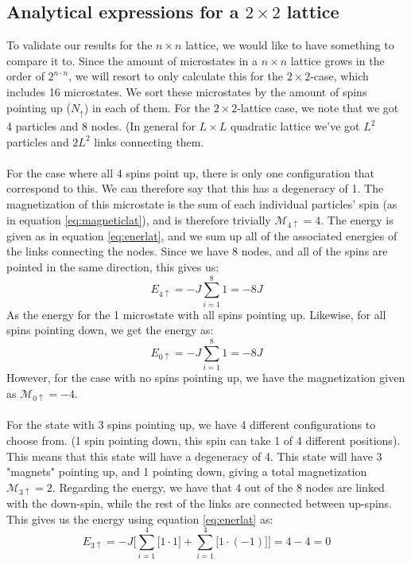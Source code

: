 \documentclass[reprint,english,notitlepage]{revtex4-1}  %
\begin{document}
\begin{appendix}

\section{Analytical expressions for a $2\times2$ lattice}\label{app:2times2}

To validate our results for the $n\times n$ lattice, we would like to have something to compare it to. Since the amount of microstates in a $n\times n $ lattice grows in the order of $2^{n\cdot n}$, we will resort to only calculate this for the $2\times 2$-case, which includes 16 microstates. We sort these microstates by the amount of spins pointing up ($N_\uparrow$) in each of them. For the $2\times2$-lattice case, we note that we got 4 particles and 8 nodes. (In general for $L\times L$ quadratic lattice we've got $L^2$ particles and $2L^2$ links connecting them.
\\
\\
For the case where all 4 spins point up, there is only one configuration that correspond to this. We can therefore say that this has a degeneracy of 1. The magnetization of this microstate is the sum of each individual particles' spin (as in equation \ref{eq:magneticlat}), and is therefore trivially $\mathcal{M}_{4\uparrow} = 4$. The energy is given as in equation \ref{eq:enerlat}, and we sum up all of the associated energies of the links connecting the nodes. Since we have 8 nodes, and all of the spins are pointed in the same direction, this gives us:
$$
E_{4\uparrow} = -J\sum\limits_{i=1}^8 1 = -8J
$$
As the energy for the 1 microstate with all spins pointing up. Likewise, for all spins pointing down, we get the energy as:
$$
E_{0\uparrow} = -J\sum\limits_{i=1}^8 1 = -8J
$$
However, for the case with no spins pointing up, we have the magnetization given as $\mathcal{M}_{0\uparrow} = -4$.
\\
\\
For the state with 3 spins pointing up, we have 4 different configurations to choose from. (1 spin pointing down, this spin can take 1 of 4 different positions). This means that this state will have a degeneracy of 4. This state will have 3 "magnets" pointing up, and 1 pointing down, giving a total magnetization $\mathcal{M}_{3\uparrow} = 2$. Regarding the energy, we have that 4 out of the 8 nodes are linked with the down-spin, while the rest of the links are connected between up-spins. This gives us the energy using equation \ref{eq:enerlat} as:
$$
E_{3\uparrow} = -J\Bigg[\sum\limits_{i=1}^4 \Big[1\cdot1\Big] + \sum\limits_{i=1}^4 \Big[1\cdot(-1)\Big]\Bigg] = 4-4 = 0
$$
\end{appendix}
\end{document}
